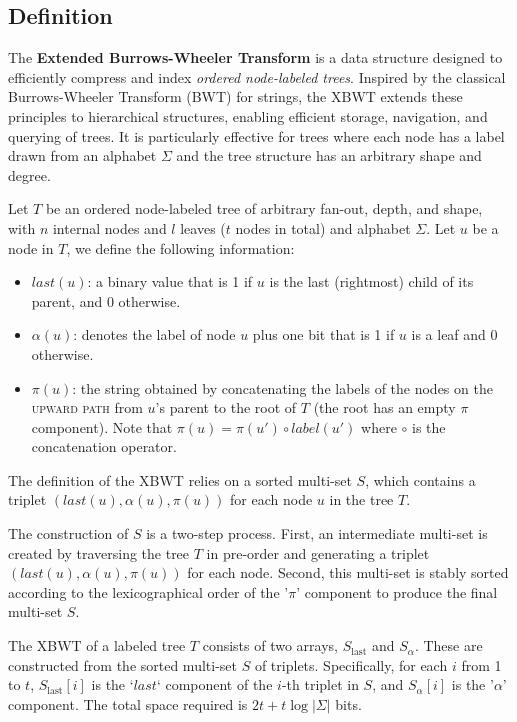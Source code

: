 \subsection{Definition}
The \textbf{Extended Burrows-Wheeler Transform} is a data structure designed to efficiently compress and index \emph{ordered node-labeled trees}. Inspired by the classical Burrows-Wheeler Transform (BWT) \cite{burrows1994block} for strings, the XBWT extends these principles to hierarchical structures, enabling efficient storage, navigation, and querying of trees. It is particularly effective for trees where each node has a label drawn from an alphabet $\Sigma$ and the tree structure has an arbitrary shape and degree.

\begin{definition} 
    \label{def:node_informations}
    Let $T$ be an ordered node-labeled tree of arbitrary fan-out, depth, and shape, with $n$ internal nodes and $l$ leaves ($t$ nodes in total) and alphabet $\Sigma$. Let $u$ be a node in $T$, we define the following information:
    \begin{itemize}
        \item $last(u)$: a binary value that is 1 if $u$ is the last (rightmost) child of its parent, and 0 otherwise.
        \item $\alpha(u)$: denotes the label of node $u$ plus one bit that is 1 if $u$ is a leaf and 0 otherwise.
        \item $\pi(u)$: the string obtained by concatenating the labels of the nodes on the \textsc{upward path} from $u$'s parent to the root of $T$ (the root has an empty $\pi$ component). Note that $\pi(u) = \pi(u') \circ label(u')$ where $\circ$ is the concatenation operator.
    \end{itemize}
\end{definition}

The definition of the XBWT relies on a sorted multi-set $S$, which contains a triplet $(last(u), \alpha(u), \pi(u))$ for each node $u$ in the tree $T$.

The construction of $S$ is a two-step process. First, an intermediate multi-set is created by traversing the tree $T$ in pre-order and generating a triplet $(last(u), \alpha(u), \pi(u))$ for each node. Second, this multi-set is stably sorted according to the lexicographical order of the '$\pi$' component to produce the final multi-set $S$.

\begin{theorem}
    The XBWT of a labeled tree $T$ consists of two arrays, $S_{\text{last}}$ and $S_{\alpha}$. These are constructed from the sorted multi-set $S$ of triplets. Specifically, for each $i$ from 1 to $t$, $S_{\text{last}}[i]$ is the `$last$` component of the $i$-th triplet in $S$, and $S_{\alpha}[i]$ is the '$\alpha$' component. The total space required is $2t + t \log |\Sigma|$ bits.
\end{theorem}


